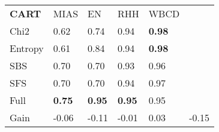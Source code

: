 \begin{tabular}{|l|l|l|l|l|l}
\cline{1-5}
        \textbf{CART} & MIAS              & EN                & RHH               & WBCD      &         \\
\cline{1-5}
Chi2    &  0.62 &  0.74 &  0.94 & \textbf{0.98} \\
Entropy &  0.61 &  0.84 &  0.94 & \textbf{0.98} \\
SBS     &  0.70 &  0.70 &  0.93 & 0.96 \\
SFS     &  0.70 &  0.70 &  0.94 & 0.97 \\
Full    &  \textbf{0.75} &  \textbf{0.95} &  \textbf{0.95} & 0.95 \\
\cline{1-5}
Gain    & -0.06 & -0.11 & -0.01 & 0.03 & -0.15 \\
\cline{1-5}
\end{tabular}
